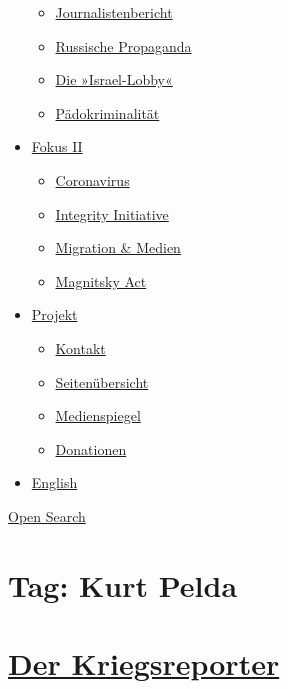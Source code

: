 \begin{itemize}
  \begin{itemize}
  \tightlist
  \item
    \href{https://swprs.org/bericht-eines-journalisten/}{Journalistenbericht}
  \item
    \href{https://swprs.org/russische-propaganda/}{Russische Propaganda}
  \item
    \href{https://swprs.org/die-israel-lobby-fakten-und-mythen/}{Die
    »Israel-Lobby«}
  \item
    \href{https://swprs.org/geopolitik-und-paedokriminalitaet/}{Pädokriminalität}
  \end{itemize}
\item
  \href{https://swprs.org/migration-und-medien/}{Fokus II}

  \begin{itemize}
  \tightlist
  \item
    \href{https://swprs.org/covid-19-hinweis-ii/}{Coronavirus}
  \item
    \href{https://swprs.org/die-integrity-initiative/}{Integrity
    Initiative}
  \item
    \href{https://swprs.org/migration-und-medien/}{Migration \& Medien}
  \item
    \href{https://swprs.org/der-fall-magnitsky/}{Magnitsky Act}
  \end{itemize}
\item
  \href{https://swprs.org/kontakt/}{Projekt}

  \begin{itemize}
  \tightlist
  \item
    \href{https://swprs.org/kontakt/}{Kontakt}
  \item
    \href{https://swprs.org/uebersicht/}{Seitenübersicht}
  \item
    \href{https://swprs.org/medienspiegel/}{Medienspiegel}
  \item
    \href{https://swprs.org/donationen/}{Donationen}
  \end{itemize}
\item
  \href{https://swprs.org/contact/}{English}
\end{itemize}

\protect\hyperlink{}{Open Search}

\hypertarget{tag-kurt-pelda}{%
\section{Tag: Kurt Pelda}\label{tag-kurt-pelda}}

\hypertarget{der-kriegsreporter}{%
\section{\texorpdfstring{\href{https://swprs.org/2017/03/01/der-kriegsreporter/}{Der
Kriegsreporter}}{Der Kriegsreporter}}\label{der-kriegsreporter}}

